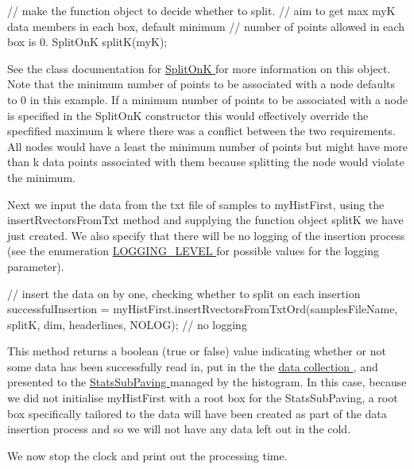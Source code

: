 \begin{DoxyCodeInclude}
    // make the function object to decide whether to split.
    // aim to get max myK data members in each box, default minimum
    // number of points allowed in each box is 0.
    SplitOnK splitK(myK);

\end{DoxyCodeInclude}


\-See the class documentation for \hyperlink{classsubpavings_1_1SplitOnK}{\-Split\-On\-K } for more information on this object. \-Note that the minimum number of points to be associated with a node defaults to 0 in this example. \-If a minimum number of points to be associated with a node is specified in the \-Split\-On\-K constructor this would effectively override the specfified maximum k where there was a conflict between the two requirements. \-All nodes would have a least the minimum number of points but might have more than k data points associated with them because splitting the node would violate the minimum.

\-Next we input the data from the txt file of samples to my\-Hist\-First, using the insert\-Rvectors\-From\-Txt method and supplying the function object split\-K we have just created. \-We also specify that there will be no logging of the insertion process (see the enumeration \hyperlink{namespacesubpavings_aef8e51096b59ecaf1a1e9b2ee24b6089}{\-L\-O\-G\-G\-I\-N\-G\-\_\-\-L\-E\-V\-E\-L } for possible values for the logging parameter).


\begin{DoxyCodeInclude}
    // insert the data on by one, checking whether to split on each insertion
    successfulInsertion = myHistFirst.insertRvectorsFromTxtOrd(samplesFileName,
            splitK, dim, headerlines, NOLOG); // no logging

\end{DoxyCodeInclude}


\-This method returns a boolean (true or false) value indicating whether or not some data has been successfully read in, put in the the \hyperlink{}{data collection }, and presented to the \hyperlink{classsubpavings_1_1SPSnode}{\-Stats\-Sub\-Paving } managed by the histogram. \-In this case, because we did not initialise my\-Hist\-First with a root box for the \-Stats\-Sub\-Paving, a root box specifically tailored to the data will have been created as part of the data insertion process and so we will not have any data left out in the cold.

\-We now stop the clock and print out the processing time.


